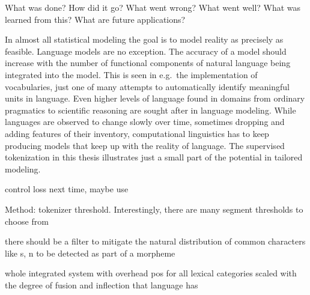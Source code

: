 \usepackage{biblatex}What was done?
How did it go?
What went wrong?
What went well?
What was learned from this?
What are future applications?

In almost all statistical modeling the goal is to model reality as precisely as feasible.
Language models are no exception.
The accuracy of a model should increase with the number of functional components of natural language being integrated into the model.
This is seen in e.g.\ the implementation of vocabularies, just one of many attempts to automatically identify meaningful units in language.
Even higher levels of language found in domains from ordinary pragmatics to scientific reasoning are sought after in language modeling.
While languages are observed to change slowly over time, sometimes dropping and adding features of their inventory, computational linguistics has to keep producing models that keep up with the reality of language.
The supervised tokenization in this thesis illustrates just a small part of the potential in tailored modeling.

control loss next time, maybe use ~\textcite{bertbasegermancasedsequel}

Method: tokenizer threshold.
Interestingly, there are many segment thresholds to choose from

there should be a filter to mitigate the natural distribution of common characters like s, n to be detected as  part of a morpheme

whole integrated system with overhead pos for all lexical categories
scaled with the degree of fusion and inflection that language has
